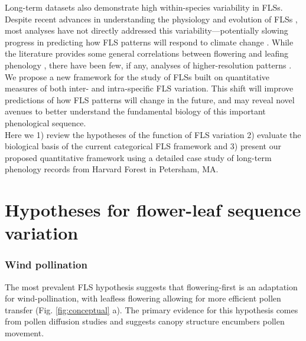 \documentclass[11pt]{article}
\begin{document}
\noindent Long-term datasets also demonstrate high within-species variability in FLSs. Despite recent advances in understanding the physiology and evolution of FLSs \citep{Gougherty2018,Savage2019}, most analyses have not directly addressed this variability---potentially slowing progress in predicting how FLS patterns will respond to climate change . While the literature provides some general correlations between flowering and leafing phenology \citep[e.g.][]{Lechowicz_1995, Ettinger2018}, there have been few, if any, analyses of higher-resolution patterns \citep{Gougherty2018}. \\

\noindent We propose a new framework for the study of FLSs built on quantitative measures of both inter- and intra-specific FLS variation. This shift will improve predictions of how FLS patterns will change in the future, and  may reveal novel avenues to better understand the fundamental biology of this important phenological sequence.\\

\noindent Here we 1) review the hypotheses of the function of FLS variation 2) evaluate the biological basis of the current categorical FLS framework and 3) present our proposed quantitative framework using a detailed case study of long-term phenology records from Harvard Forest in Petersham, MA.

\section*{Hypotheses for flower-leaf sequence variation}
\subsubsection*{ Wind pollination}
\noindent The most prevalent FLS hypothesis suggests that flowering-first is an adaptation for wind-pollination, with leafless flowering allowing for more efficient pollen transfer \citep{Whitehead1969}  (Fig. \ref{fig:conceptual} a). The primary evidence for this hypothesis comes from pollen diffusion studies \citep[e.g., particle movement through closed and open canopies,][]{Niklas1985, Milleron2012} and suggests canopy structure encumbers pollen movement. %
\end{document}
